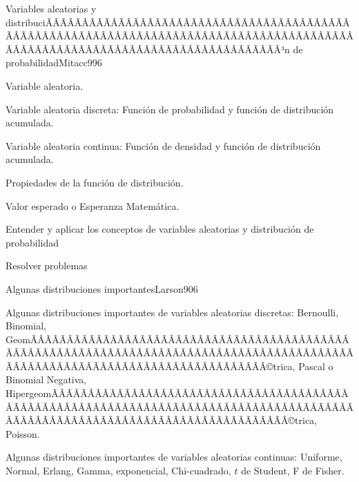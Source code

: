 \begin{sumilla}
\begin{unit}{Variables aleatorias y distribuciÃÂÃÂÃÂÃÂÃÂÃÂÃÂÃÂÃÂÃÂÃÂÃÂÃÂÃÂÃÂÃÂÃÂÃÂÃÂÃÂÃÂÃÂÃÂÃÂÃÂÃÂÃÂÃÂÃÂÃÂÃÂÃÂÃÂÃÂÃÂÃÂÃÂÃÂÃÂÃÂÃÂÃÂÃÂÃÂÃÂÃÂÃÂÃÂÃÂÃÂÃÂÃÂÃÂÃÂÃÂÃÂÃÂÃÂÃÂÃÂÃÂÃÂÃÂÃÂ³n de probabilidad}{Mitacc99}{6}
   \begin{topicos}
         \item  Variable aleatoria.
	 \item  Variable aleatoria discreta: Funci\'on de probabilidad y funci\'on de distribuci\'on acumulada.
         \item  Variable aleatoria continua: Funci\'on de densidad y funci\'on de distribuci\'on acumulada.
	 \item  Propiedades de la funci\'on de distribuci\'on.
         \item  Valor esperado o Esperanza Matem\'atica.
   \end{topicos}

   \begin{objetivos}
         \item  Entender y aplicar los conceptos de variables aleatorias y  distribuci\'on de probabilidad
         \item  Resolver problemas
   \end{objetivos}
\end{unit}

\begin{unit}{Algunas distribuciones importantes}{Larson90}{6}
   \begin{topicos}
         \item  Algunas distribuciones importantes de variables aleatorias discretas: Bernoulli, Binomial,  GeomÃÂÃÂÃÂÃÂÃÂÃÂÃÂÃÂÃÂÃÂÃÂÃÂÃÂÃÂÃÂÃÂÃÂÃÂÃÂÃÂÃÂÃÂÃÂÃÂÃÂÃÂÃÂÃÂÃÂÃÂÃÂÃÂÃÂÃÂÃÂÃÂÃÂÃÂÃÂÃÂÃÂÃÂÃÂÃÂÃÂÃÂÃÂÃÂÃÂÃÂÃÂÃÂÃÂÃÂÃÂÃÂÃÂÃÂÃÂÃÂÃÂÃÂÃÂÃÂ©trica, Pascal o Binomial Negativa, HipergeomÃÂÃÂÃÂÃÂÃÂÃÂÃÂÃÂÃÂÃÂÃÂÃÂÃÂÃÂÃÂÃÂÃÂÃÂÃÂÃÂÃÂÃÂÃÂÃÂÃÂÃÂÃÂÃÂÃÂÃÂÃÂÃÂÃÂÃÂÃÂÃÂÃÂÃÂÃÂÃÂÃÂÃÂÃÂÃÂÃÂÃÂÃÂÃÂÃÂÃÂÃÂÃÂÃÂÃÂÃÂÃÂÃÂÃÂÃÂÃÂÃÂÃÂÃÂÃÂ©trica, Poisson.
	 \item  Algunas distribuciones importantes de variables aleatorias continuas: Uniforme, Normal, Erlang, Gamma, exponencial, Chi-cuadrado, $t$ de Student, F de Fisher.
   \end{topicos}


\end{unit}
\end{sumilla}

